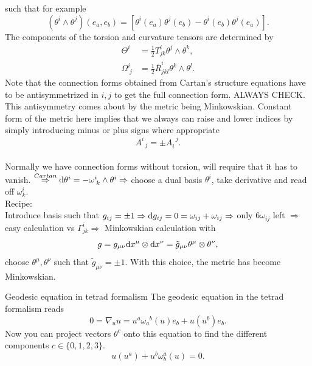 such that for example
\begin{equation}
	(\theta^i\wedge \theta^j)(e_a,e_b) =\left[\theta^i(e_a) \theta^j(e_b) - \theta^i(e_b) \theta^j(e_a)\right].
\end{equation}
The components of the torsion and curvature tensors are determined by 
\begin{align}
	\Theta^i &= \frac{1}{2} T^i_{jk} \theta^j \wedge \theta^k,\\
	\Omega^i_{\;j} &= \frac{1}{2}  \bar{R}^i_{jkl} \theta^k \wedge \theta^l.
\end{align}
Note that the connection forms obtained from Cartan's structure equations have to be antisymmetrized in $i,j$ to get the full connection form. ALWAYS CHECK. This antisymmetry comes about by the metric being Minkowskian. Constant form of the metric here implies that we always can raise and lower indices by simply introducing minus or plus signs where appropriate
\begin{equation*}
	A^i_{\;\;j} = \pm A^{\;\; j}_i.
\end{equation*}
\\
\bullet Normally we have connection forms without torsion, will require that it has to vanish.
$\stackrel{Cartan}{\Rightarrow} \mathrm{d} \theta^i = - \omega^i_{\;k} \wedge \theta^i \Rightarrow$ choose a dual basis $\theta^i$, take derivative and read off $\omega^i_k$.\\
Recipe:\\
Introduce basis such that $g_{ij}=\pm 1\Rightarrow \mathrm{d} g_{ij} = 0 = \omega_{ij}+\omega_{ij} \Rightarrow$ only $6 \omega_{ij}$ left $ \Rightarrow$ easy calculation vs $\Gamma^i_{jk}\Rightarrow$ Minkowskian calculation with 
\begin{equation}
	g = g_{\mu \nu} \mathrm{d} x^{\mu} \otimes \mathrm{d} x^{\nu} = \tilde{g}_{\mu \nu} \theta^{\mu} \otimes \theta^{\nu},
\end{equation}
choose $\theta^{\mu},\theta^{\nu}$ such that $\tilde{g}_{\mu \nu} = \pm 1$. With this choice, the metric has become Minkowskian.
\begin{mybox}{Geodesic equation in tetrad formalism}
	The geodesic equation in the tetrad formalism reads
	\begin{equation}
		0=\nabla_u u = u^a \omega^{\;\;b}_a (u) e_b + u(u^b) e_b.
	\end{equation}
	Now you can project vectors $\theta^c$ onto this equation to find the different components $c \in \{0,1,2,3\}$.
	\begin{equation}
		u(u^a) + u^b \omega^a_b (u)=0.
	\end{equation}
\end{mybox}
